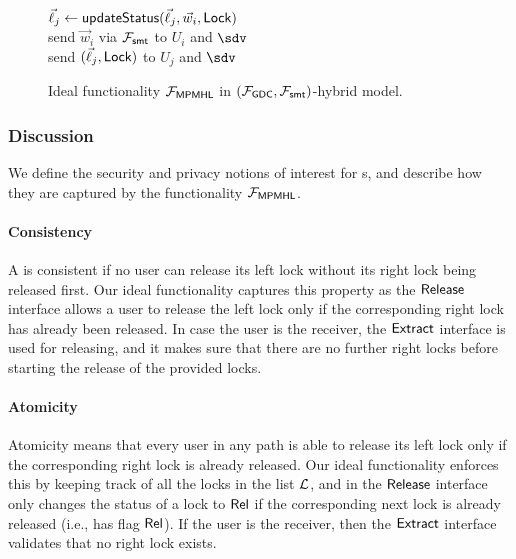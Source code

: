 \begin{figure*}[!h]
{\begin{minipage}[t]{0.45\textwidth}
{				\quad $\vec{\ell}_j \gets \mathsf{updateStatus}(\vec{\ell}_j, \vec{w}_i, \mathsf{Lock})$	\\
				\quad send $\vec{w}_i$ via $\mathcal{F}_{\mathsf{smt}}$ to $U_i$ and $\sdv$					\\
				\quad send $(\vec{\ell}_j, \mathsf{Lock})$ to $U_j$ and $\sdv$
			}
			\\
		\end{minipage}
	}
	
	\caption{Ideal functionality $\mathcal{F}_{\mathsf{MPMHL}}$ in $(\mathcal{F}_{\mathsf{GDC}}, \mathcal{F}_{\mathsf{smt}})$-hybrid model.}
	\label{fig:ideal-mpmhl}
\end{figure*}


\subsubsection{Discussion}
\label{sec:mpmhl-discussion}

We define the security and privacy notions of interest for {\sysname}s, and describe how they 
are captured by the functionality $\mathcal{F}_{\mathsf{MPMHL}}$.


\paragraph{Consistency} A \sysname is consistent if no user can release its left lock without its 
right lock being released first. Our ideal functionality captures this property as the $\mathsf{Release}$ 
interface allows a user to release the left lock only if the corresponding right lock has already 
been released. In case the user is the receiver, the $\mathsf{Extract}$ interface is used for releasing, 
and it makes sure that there are no further right locks before starting the release of the 
provided locks.


\paragraph{Atomicity} Atomicity means that every user in any path is able to release its left 
lock only if the corresponding right lock is already released. Our ideal functionality enforces 
this by keeping track of all the locks in the list $\mathcal{L}$, and in the $\mathsf{Release}$ interface only 
changes the status of a lock to $\mathsf{Rel}$ if the corresponding next lock is already released (i.e., 
has flag $\mathsf{Rel}$). If the user is the receiver, then the $\mathsf{Extract}$ interface validates that no 
right lock exists.

